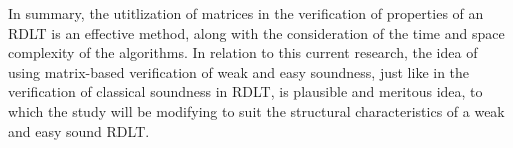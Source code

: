     In summary, the utitlization of matrices in the verification of properties of an RDLT is an effective method, along with the consideration of the time and space complexity of the algorithms. In relation to this current research, the idea of using matrix-based verification of weak and easy soundness, just like in the verification of classical soundness in RDLT, is plausible and meritous idea, to which the study will be modifying to suit the structural characteristics of a weak and easy sound RDLT. \\